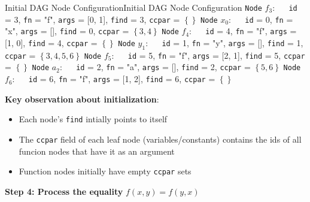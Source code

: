 \documentclass[a4paper]{article}
\theoremstyle{definition}
\begin{document}
\begin{definition}{Initial DAG Node Configuration}{Initial DAG Node Configuration}
\texttt{Node} $f_3$: $\quad$ \texttt{id} = 3, \texttt{fn} = "f", \texttt{args} = [0, 1], \texttt{find} = 3, \texttt{ccpar} = \( \left\{\right\} \)
\vspace{1em}
\noindent
\newline
\texttt{Node} $x_0$: $\quad$ \texttt{id} = 0, \texttt{fn} = "x", \texttt{args} = [], \texttt{find} = 0, \texttt{ccpar} = \( \left\{3, 4\right\} \)
\vspace{1em}
\noindent
\newline
\texttt{Node} $f_4$: $\quad$ \texttt{id} = 4, \texttt{fn} = "f", \texttt{args} = [1, 0], \texttt{find} = 4, \texttt{ccpar} = \( \left\{\right\} \)
\vspace{1em}
\noindent
\newline
\texttt{Node} $y_1$: $\quad$ \texttt{id} = 1, \texttt{fn} = "y", \texttt{args} = [], \texttt{find} = 1, \texttt{ccpar} = \( \left\{3, 4, 5, 6\right\} \)
\vspace{1em}
\noindent
\newline
\texttt{Node} $f_5$: $\quad$ \texttt{id} = 5, \texttt{fn} = "f", \texttt{args} = [2, 1], \texttt{find} = 5, \texttt{ccpar} = \( \left\{\right\} \)
\vspace{1em}
\noindent
\newline
\texttt{Node} $a_2$: $\quad$ \texttt{id} = 2, \texttt{fn} = "a", \texttt{args} = [], \texttt{find} = 2, \texttt{ccpar} = \( \left\{5, 6\right\} \)
\vspace{1em}
\noindent
\newline
\texttt{Node} $f_6$: $\quad$ \texttt{id} = 6, \texttt{fn} = "f", \texttt{args} = [1, 2], \texttt{find} = 6, \texttt{ccpar} = \( \left\{\right\} \)
\end{definition}
\textbf{Key observation about initialization}:
\begin{itemize}
	\item Each node's \texttt{find} intially points to itself 
	\item The \texttt{ccpar} field of each leaf node (variables/constants) contains the ids of all funcion nodes that have it as an argument 
	\item Function nodes initially have empty \texttt{ccpar} sets
\end{itemize}
\textbf{Step 4: Process the equality} \( f(x,y) = f(y,x) \)   
\vspace{1em}
\noindent
\newline
\end{document}
